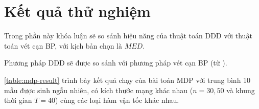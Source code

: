 \documentclass[../main.tex]{subfiles}
\begin{document}
\section{Kết quả thử nghiệm}\label{nhux1eefng-lux1ee3i-uxedch-cux1ee7a-ddd}

Trong phần này khóa luận sẽ so sánh hiệu năng của thuật toán DDD với thuật
toán vét cạn BP, với kịch bản chọn là \(MED\).

Phương pháp DDD sẽ được so sánh với phương pháp vét cạn BP (từ \cite{foschini2011complexity}).

\autoref{table:mdp-result} trình bày kết quả chạy của bài toán MDP với trung bình 10 mẫu được sinh ngẫu
nhiên, có kích thước mạng khác nhau (\(n=30,50\) và khung thời gian
\(T=40\)) cùng các loại hàm vận tốc khác nhau.

\end{document}

